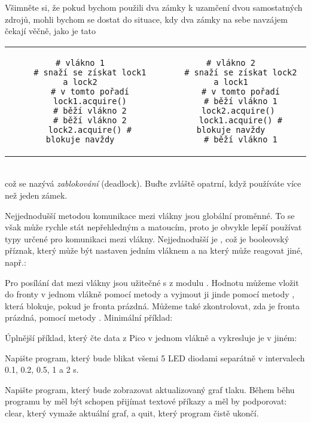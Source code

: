 Všimněte si, že pokud bychom použili dva zámky k uzamčení dvou samostatných zdrojů, mohli bychom se dostat do situace, kdy dva zámky na sebe navzájem čekají věčně, jako je tato\\
\begin{tabular}{cc}
\begin{lstlisting}[linewidth=0.5\linewidth]
    # vlákno 1
    # snaží se získat lock1 a lock2
    # v tomto pořadí
    lock1.acquire()
    # běží vlákno 2
    # běží vlákno 2
    lock2.acquire() # blokuje navždy
\end{lstlisting}&
\begin{lstlisting}[linewidth=0.5\linewidth]
    # vlákno 2
    # snaží se získat lock2 a lock1
    # v tomto pořadí
    # běží vlákno 1
    lock2.acquire() 
    lock1.acquire() # blokuje navždy
    # běží vlákno 1
\end{lstlisting}
\end{tabular}\\
což se nazývá \emph{zablokování} (deadlock). Buďte zvláště opatrní, když používáte více než jeden zámek.

Nejjednodušší metodou komunikace mezi vlákny jsou globální proměnné. To se však může rychle stát nepřehledným a matoucím, proto je obvykle lepší používat typy určené pro komunikaci mezi vlákny. Nejjednodušší je , což je booleovský příznak, který může být nastaven jedním vláknem a na který může reagovat jiné, např.:


Pro posílání dat mezi vlákny jsou užitečné s z modulu . Hodnotu můžeme vložit do fronty v jednom vlákně pomocí metody  a vyjmout ji jinde pomocí metody , která blokuje, pokud je fronta prázdná. Můžeme také zkontrolovat, zda je fronta prázdná, pomocí metody . Minimální příklad:


Úplnější příklad, který čte data z Pico v jednom vlákně a vykresluje je v jiném:


\begin{exercise}
    Napište program, který bude blikat všemi 5 LED diodami separátně v intervalech 0.1, 0.2, 0.5, 1 a 2 s.
\end{exercise}

\begin{exercise}
    Napište program, který bude zobrazovat aktualizovaný graf tlaku. Během běhu programu by měl být schopen přijímat textové příkazy a měl by podporovat: clear, který vymaže aktuální graf, a quit, který program čistě ukončí.
\end{exercise}

